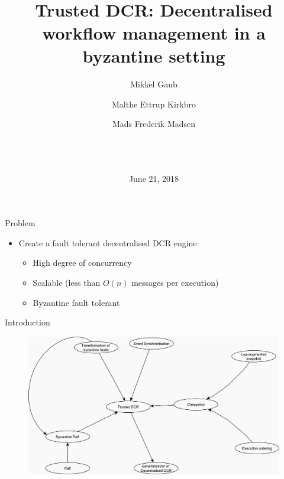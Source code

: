 \documentclass{beamer}
\title{~\\ ~\\ ~\\ Trusted DCR: Decentralised workflow management in a byzantine setting}
\author{Mikkel Gaub \and Malthe Ettrup Kirkbro \and Mads Frederik Madsen}
\date{~\\ ~\\ ~\\ \center June 21, 2018 }
\begin{document}
\maketitle

\begin{frame}{Problem}%
\begin{itemize}
  \item Create a fault tolerant decentralised DCR engine:

  \vfill

  \begin{itemize}
    \item High degree of concurrency

    \vfill

    \item Scalable (less than $O(n)$ messages per execution)

    \vfill

    \item Byzantine fault tolerant
  \end{itemize}
\end{itemize}
\end{frame}

\begin{frame}{Introduction}%
  \begin{figure}[p]
    \includegraphics[scale=0.35]{figures/topics2.pdf}
  \end{figure}
\end{frame}
\end{document}
